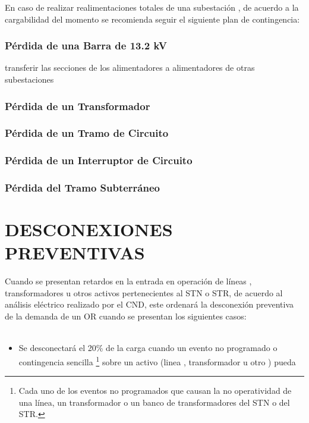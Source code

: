 \documentclass[a5paper]{book}%
\begin{document}
En caso de realizar realimentaciones totales de una subestación , de acuerdo a la cargabilidad del momento se recomienda seguir el siguiente plan de contingencia:

\subsubsection{Pérdida de una Barra de 13.2 kV}

 transferir las secciones de los alimentadores a alimentadores de otras
subestaciones

\subsubsection{Pérdida de un Transformador}

\subsubsection{Pérdida de un Tramo de Circuito}

\subsubsection{Pérdida de un Interruptor de Circuito}

\subsubsection{Pérdida del Tramo Subterráneo}

\section{DESCONEXIONES PREVENTIVAS}

Cuando se presentan retardos en la entrada  en operación de líneas , transformadores u otros activos pertenecientes al \ac{STN} o \ac{STR},  de acuerdo al análisis eléctrico  realizado por el \ac{CND},  este ordenará la desconexión preventiva de la demanda de un \ac{OR} cuando se presentan los siguientes casos: \cite{CREG2242016} \\\\

\begin{itemize}
\item Se desconectará el 20\% de la carga cuando un evento no programado o contingencia sencilla  \footnote[1]{Cada uno de los eventos no programados que causan la no operatividad de una línea, un transformador o un banco de transformadores del STN o del STR.}  sobre un activo (linea , transformador u otro ) pueda 
  \end{itemize}
\end{document}
